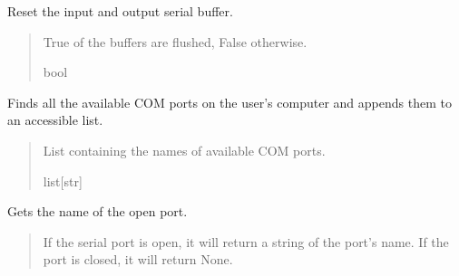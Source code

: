 \documentclass[letterpaper,10pt,english]{sphinxmanual}
\begin{document}
\begin{fulllineitems}
\begin{fulllineitems}
\label{\detokenize{SerialCommunication:SerialCommunication.COM_io.Flush}}
\pysigstartsignatures
{}
\pysigstopsignatures
\sphinxAtStartPar
Reset the input and output serial buffer.
\begin{quote}\begin{description}
\sphinxAtStartPar
True of the buffers are flushed, False otherwise.

\sphinxAtStartPar
bool

\end{description}\end{quote}

\end{fulllineitems}


\begin{fulllineitems}
\label{\detokenize{SerialCommunication:SerialCommunication.COM_io.GetCOMportsList}}
\pysigstartsignatures
{}
\pysigstopsignatures
\sphinxAtStartPar
Finds all the available COM ports on the user’s computer and appends them to an         accessible list.
\begin{quote}\begin{description}
\sphinxAtStartPar
List containing the names of available COM ports.

\sphinxAtStartPar
list{[}str{]}

\end{description}\end{quote}

\end{fulllineitems}


\begin{fulllineitems}
\label{\detokenize{SerialCommunication:SerialCommunication.COM_io.GetPortName}}
\pysigstartsignatures
{}
\pysigstopsignatures
\sphinxAtStartPar
Gets the name of the open port.
\begin{quote}\begin{description}
\sphinxAtStartPar
If the serial port is open, it will return a string of the port’s name.                 If the port is closed, it will return None.


\end{description}
\end{quote}
\end{fulllineitems}
\end{fulllineitems}
\end{document}
